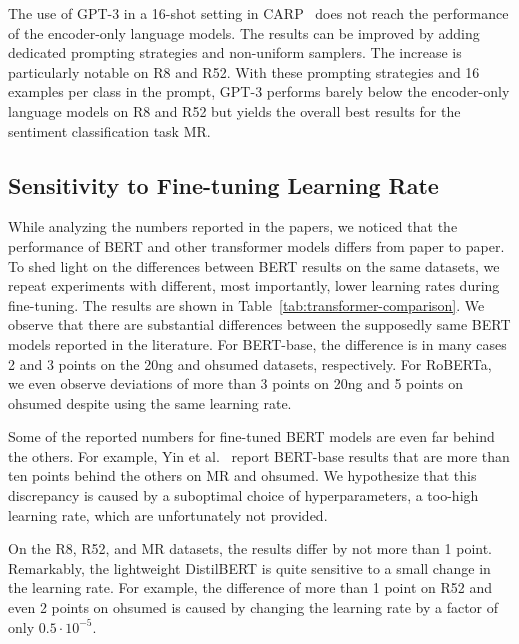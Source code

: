\documentclass[acmsmall,nonacm]{acmart}
\newcommand{\myheader}{}
\begin{document}
The use of GPT-3 in a 16-shot setting in CARP~\cite{carp} does not reach the performance of the encoder-only language models.
The results can be improved by adding dedicated prompting strategies and non-uniform samplers.
The increase is particularly notable on R8 and R52.
With these prompting strategies and 16 examples per class in the prompt, GPT-3 performs barely below the encoder-only language models on R8 and R52 but yields the overall best results for the sentiment classification task MR.

\subsection{Sensitivity to Fine-tuning Learning Rate}
While analyzing the numbers reported in the papers, we noticed that the performance of BERT and other transformer models differs from paper to paper.
To shed light on the differences between BERT results on the same datasets, we repeat experiments with different, most importantly, lower learning rates during fine-tuning.
The results are shown in Table~\ref{tab:transformer-comparison}.
We observe that there are substantial differences between the supposedly same BERT models reported in the literature.
For BERT-base, the difference is in many cases 2 and 3 points on the 20ng and ohsumed datasets, respectively.
For RoBERTa, we even observe deviations of more than 3 points on 20ng and 5 points on ohsumed despite using the same learning rate.

Some of the reported numbers for fine-tuned BERT models are even far behind the others.
For example, Yin et al.~\cite{gltc2023} report BERT-base results that are more than ten points behind the others on MR and ohsumed.
We hypothesize that this discrepancy is caused by a suboptimal choice of hyperparameters, \eg a too-high learning rate, which are unfortunately not provided.

On the R8, R52, and MR datasets, the results differ by not more than 1 point.
Remarkably, the lightweight DistilBERT is quite sensitive to a small change in the learning rate.
For example, the difference of more than 1 point on R52 and even 2 points on ohsumed is caused by changing the learning rate by a factor of only $0.5 \cdot 10^{-5}$.

\renewcommand{\myheader}{
  \caption{Comparison of different transformer models and hyperparameter settings. We report mean accuracy and standard deviation over five runs on the single-label text classification datasets (inductive). Column ``Provenance'' reports the source.
    N/P refers to the case where the paper (or potential supplementary materials) did not provide information about the learning rate.
    }
    
    \label{tab:transformer-comparison}
}

\end{document}
